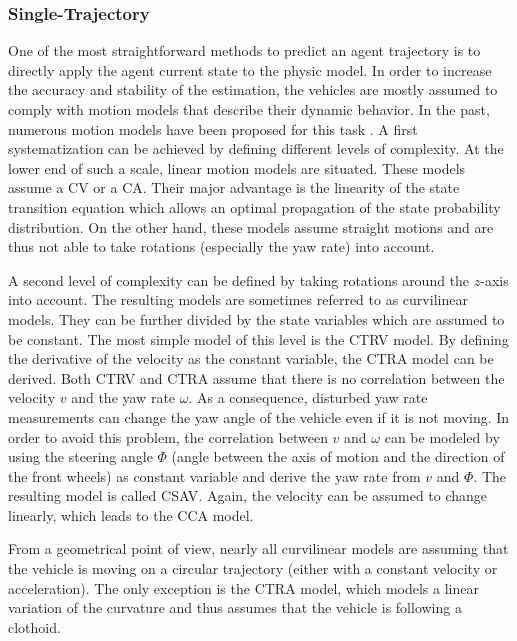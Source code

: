 \subsubsection{Single-Trajectory}
\label{subsubsec:2_single_trajectory_mp}

One of the most straightforward methods to predict an agent trajectory is to directly apply the agent current state to the physic model. In order to increase the accuracy and stability of the estimation, the vehicles are mostly assumed to comply with motion models that describe their dynamic behavior. In the past, numerous motion models have been proposed for this task \cite{miller2002adaptive, pepy2006reducing, hillenbrand2006multilevel}. A first systematization can be achieved by defining different levels of complexity. At the lower end of such a scale, linear motion models are situated. These models assume a \ac{CV} or a \ac{CA}. Their major advantage is the linearity of the state transition equation which allows an optimal propagation of the state probability distribution. On the other hand, these models assume straight motions and are thus not able to take rotations (especially the yaw rate) into account. 

A second level of complexity can be defined by taking rotations around the $z$-axis into account. The resulting models are sometimes referred to as curvilinear models. They can be further divided by the state variables which are assumed to be constant. The most simple model of this level is the \ac{CTRV} model. By defining the derivative of the velocity as the constant variable, the \ac{CTRA} model can be derived. Both \ac{CTRV} and \ac{CTRA} assume that there is no correlation between the velocity $v$ and the yaw rate $\omega$. As a consequence, disturbed yaw rate measurements can change the yaw angle of the vehicle even if it is not moving. In order to avoid this problem, the correlation between $v$ and $\omega$ can be modeled by using the steering angle $\Phi$ (angle between the axis of motion and the direction of the front wheels) as constant variable and derive the yaw rate from $v$ and $\Phi$. The resulting model is called \ac{CSAV}. Again, the velocity can be assumed to change linearly, which leads to the \ac{CCA} model. 

From a geometrical point of view, nearly all curvilinear models are assuming that the vehicle is moving on a circular trajectory (either with a constant velocity or acceleration). The only exception is the \ac{CTRA} model, which models a linear variation of the curvature and thus assumes that the vehicle is following a clothoid. 

